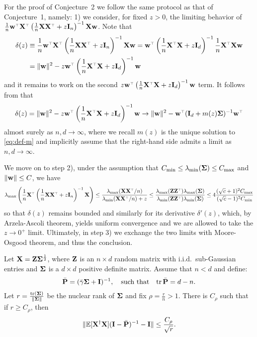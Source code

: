 \documentclass[11pt]{article}
\begin{document}
For the proof of Conjecture~2 we follow the same protocol as that of Conjecture~1, namely: 1) we consider, for fixed $z > 0$, the limiting behavior of $\frac1n \w^\top \X^\top \left( \frac1n \X \X^\top + z \I_n \right)^{-1} \X \w$. Note that
\begin{align*}
  \delta(z) &\equiv \frac1n \w^\top \X^\top \left( \frac1n \X \X^\top + z \I_n \right)^{-1} \X \w = \w^\top \left( \frac1n \X^\top \X + z \I_d \right)^{-1} \frac1n \X^\top \X \w \\ 
  &= \| \w \|^2 - z \w^\top \left( \frac1n \X^\top \X + z \I_d \right)^{-1} \w
\end{align*}
and it remains to work on the second $z \w^\top \left( \frac1n \X^\top \X + z \I_d \right)^{-1} \w$ term.
It follows from \cite{hachem2013bilinear} that 
\[
   \delta(z) = \| \w \|^2 - z \w^\top \left( \frac1n \X^\top \X + z \I_d \right)^{-1} \w  \to \| \w \|^2 - \w^\top (\I_d + m(z) \Sigmab)^{-1} \w^\top 
\]
almost surely as $n,d \to \infty$, where we recall $m(z)$ is the unique solution to \eqref{eq:def-m} and implicitly assume that the right-hand side admits a limit as $n,d \to \infty$.

We move on to step 2), under the assumption that $C_{\min} \le \lambda_{\min} (\mathbf{\Sigma}) \le C_{\max}$ and $\| \mathbf w \| \le C$, we have
\[
  \lambda_{\max} \left( \frac1n \X^\top \left( \frac1n \X \X^\top + z \I_n \right)^{-1} \X \right) \le \frac{ \lambda_{\max} (\X \X^\top/n) }{ \lambda_{\min} (\X \X^\top/n) + z } \le \frac{ \lambda_{\max} (\Z \Z^\top) \lambda_{\max} (\Sigmab) }{ \lambda_{\min} (\Z \Z^\top) \lambda_{\min} (\Sigmab) } \le 4 \frac{ (\sqrt c + 1)^2 C_{\max} }{ (\sqrt c -1)^2 C_{\min} }
\]
so that $\delta(z)$ remains bounded and similarly for its derivative $\delta'(z)$, which, by Arzela-Ascoli theorem, yields uniform convergence and we are allowed to take the $z \to 0^+$ limit. Ultimately, in step 3) we exchange the two limits with Moore-Osgood theorem, and thus the conclusion.


\begin{corollary}\label{coro:projection}
Let $\mathbf X = \mathbf Z\mathbf{\Sigma}^{\frac12}$, where $\mathbf Z$ is an $n\times d$ random
matrix with
i.i.d.~sub-Gaussian entries and $\mathbf{\Sigma}$ is a $d\times d$
positive definite matrix. Assume that $n<d$ and define:
\begin{align*}
\bar{\mathbf P} = (\bar\gamma\mathbf{\Sigma} + \mathbf I)^{-1},\quad\text{such that}\quad\mathrm{tr}\,\bar{\mathbf P}=d-n.
\end{align*}
Let $r=\frac{\mathrm{tr}(\mathbf{\Sigma})}{\|\mathbf{\Sigma}\|}$ be the nuclear rank of
$\mathbf{\Sigma}$ and fix $\rho=\frac rn > 1$. There is $C_{\rho}$ such that if $r\geq C_\rho$, then
\begin{align}
  \| \mathbb E[\mathbf X^\dagger\mathbf X] (\mathbf I - \bar {\mathbf P})^{-1} - \mathbf I \| \le \frac {C_\rho}{\sqrt r}.
\end{align}
\end{corollary}
\end{document}
